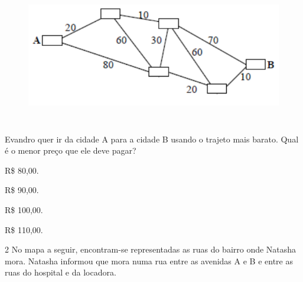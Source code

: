 \begin{figure}[H]
\centering\includegraphics[width=5.90625in,height=2.38542in]{./imgSAEB_6_MAT/media/image74.png}
\end{figure}

Evandro quer ir da cidade A para a cidade B usando o trajeto mais
barato.
Qual é o menor preço que ele deve pagar?

\begin{escolha}
\item R\$ 80,00.
\item R\$ 90,00.
\item R\$ 100,00.
\item R\$ 110,00.
\end{escolha}



\num{2} No mapa a seguir, encontram-se representadas as ruas do bairro onde
Natasha mora. Natasha informou que mora numa rua entre as avenidas A e B e entre as
ruas do hospital e da locadora.

